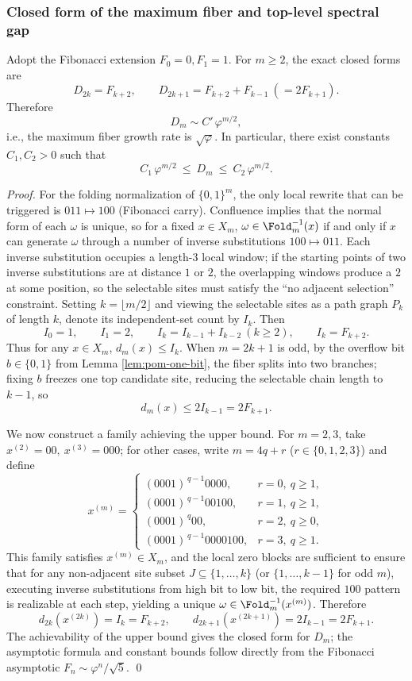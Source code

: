 \subsubsection{Closed form of the maximum fiber and top-level spectral gap}\label{subsec:pom-top-fiber}
\begin{theorem}\label{thm:pom-max-fiber}
Adopt the Fibonacci extension $F_0=0,F_1=1$. For $m\ge 2$, the exact closed forms are
\[
D_{2k}=F_{k+2},
\qquad
D_{2k+1}=F_{k+2}+F_{k-1}\ (=2F_{k+1}).
\]
Therefore
\[
D_m\sim C'\,\varphi^{m/2},
\]
i.e., the maximum fiber growth rate is $\sqrt{\varphi}$. In particular, there exist constants $C_1,C_2>0$ such that
\[
C_1\,\varphi^{m/2}\ \le\ D_m\ \le\ C_2\,\varphi^{m/2}.
\]
\end{theorem}
\begin{proof}
For the folding normalization of $\{0,1\}^m$, the only local rewrite that can be triggered is
\(
011\mapsto 100
\)
(Fibonacci carry). Confluence implies that the normal form of each $\omega$ is unique, so for a fixed $x\in X_m$, $\omega\in\Fold_m^{-1}(x)$ if and only if $x$ can generate $\omega$ through a number of inverse substitutions $100\mapsto 011$. Each inverse substitution occupies a length-$3$ local window; if the starting points of two inverse substitutions are at distance $1$ or $2$, the overlapping windows produce a $2$ at some position, so the selectable sites must satisfy the ``no adjacent selection'' constraint. Setting $k=\lfloor m/2\rfloor$ and viewing the selectable sites as a path graph $P_k$ of length $k$, denote its independent-set count by $I_k$. Then
\[
I_0=1,\qquad I_1=2,\qquad I_k=I_{k-1}+I_{k-2}\ (k\ge 2),
\qquad I_k=F_{k+2}.
\]
Thus for any $x\in X_m$, $d_m(x)\le I_k$. When $m=2k+1$ is odd, by the overflow bit $b\in\{0,1\}$ from Lemma \ref{lem:pom-one-bit}, the fiber splits into two branches; fixing $b$ freezes one top candidate site, reducing the selectable chain length to $k-1$, so
\[
d_m(x)\le 2I_{k-1}=2F_{k+1}.
\]

We now construct a family achieving the upper bound. For $m=2,3$, take
\(
x^{(2)}=00,\ x^{(3)}=000
\); for other cases, write $m=4q+r$ ($r\in\{0,1,2,3\}$) and define
\[
x^{(m)}=
\begin{cases}
(0001)^{\,q-1}0000,& r=0,\ q\ge 1,\\[2pt]
(0001)^{\,q-1}00100,& r=1,\ q\ge 1,\\[2pt]
(0001)^{\,q}00,& r=2,\ q\ge 0,\\[2pt]
(0001)^{\,q-1}0000100,& r=3,\ q\ge 1.
\end{cases}
\]
This family satisfies $x^{(m)}\in X_m$, and the local zero blocks are sufficient to ensure that for any non-adjacent site subset $J\subseteq\{1,\dots,k\}$ (or $\{1,\dots,k-1\}$ for odd $m$), executing inverse substitutions from high bit to low bit, the required $100$ pattern is realizable at each step, yielding a unique $\omega\in\Fold_m^{-1}(x^{(m)})$. Therefore
\[
d_{2k}(x^{(2k)})=I_k=F_{k+2},
\qquad
d_{2k+1}(x^{(2k+1)})=2I_{k-1}=2F_{k+1}.
\]
The achievability of the upper bound gives the closed form for $D_m$; the asymptotic formula and constant bounds follow directly from the Fibonacci asymptotic $F_n\sim \varphi^n/\sqrt5$. \qed
\end{proof}

